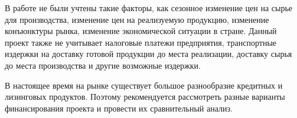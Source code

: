 В работе не были учтены такие факторы, как сезонное изменение цен на сырье для производства, изменение цен на реализуемую продукцию, изменение конъюнктуры рынка, изменение экономической ситуации в стране. Данный проект также не учитывает налоговые платежи предприятия, транспортные издержки на доставку готовой продукции до места реализации, доставку сырья до места производства и другие возможные издержки.

В настоящее время на рынке существует большое разнообразие кредитных и лизинговых продуктов. Поэтому рекомендуется рассмотреть разные варианты финансирования проекта и провести их сравнительный анализ.


















